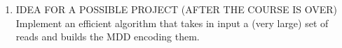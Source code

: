 \documentclass[12pt]{article}
\begin{document}
\begin{enumerate}
\begin{enumerate}[label=(\alph*)]

    
    \item IDEA FOR A POSSIBLE PROJECT (AFTER THE COURSE IS OVER) Implement an efficient algorithm that takes in input a (very large) set of reads and builds the MDD encoding them.



\end{enumerate}
\end{enumerate}
\end{document}
